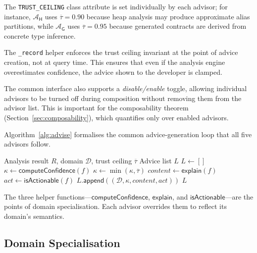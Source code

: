 \documentclass[11pt]{article}
\newcommand{\Adv}{\mathcal{A}}
\newcommand{\AdvH}{\Adv_{\mathsf{H}}}
\newcommand{\AdvG}{\Adv_{\mathsf{G}}}
\newcommand{\Domain}{\mathcal{D}}
\newcommand{\Trust}{\tau}
\newcommand{\TrustCeil}{\overline{\Trust}}
\newcommand{\Conf}{\kappa}
\begin{document}
The \texttt{TRUST\_CEILING} class attribute is set individually by each
advisor; for instance, $\AdvH$ uses $\TrustCeil = 0.90$ because heap
analysis may produce approximate alias partitions, while $\AdvG$ uses
$\TrustCeil = 0.95$ because generated contracts are derived from
concrete type inference.

\begin{remark}
The \texttt{\_record} helper enforces the trust ceiling invariant
at the point of advice creation, not at query time.  This ensures
that even if the analysis engine overestimates confidence, the
advice shown to the developer is clamped.
\end{remark}

The common interface also supports a \emph{disable/enable} toggle,
allowing individual advisors to be turned off during composition
without removing them from the advisor list.  This is important for
the composability theorem (Section~\ref{sec:composability}), which
quantifies only over enabled advisors.

Algorithm~\ref{alg:advise} formalises the common advice-generation
loop that all five advisors follow.

\begin{algorithm}[ht]
\caption{Common Advisor Loop}\label{alg:advise}
\begin{algorithmic}[1]
\REQUIRE Analysis result $R$, domain $\Domain$, trust ceiling $\TrustCeil$
\ENSURE Advice list $L$
\STATE $L \leftarrow []$
  \STATE $\Conf \leftarrow \mathsf{computeConfidence}(f)$
  \STATE $\Conf \leftarrow \min(\Conf, \TrustCeil)$
  \STATE $\mathit{content} \leftarrow \mathsf{explain}(f)$
  \STATE $\mathit{act} \leftarrow \mathsf{isActionable}(f)$
  \STATE $L.\mathsf{append}((\Domain, \Conf, \mathit{content}, \mathit{act}))$
\ENDFOR
\RETURN $L$
\end{algorithmic}
\end{algorithm}

The three helper functions—$\mathsf{computeConfidence}$,
$\mathsf{explain}$, and $\mathsf{isActionable}$—are the points
of domain specialisation.  Each advisor overrides them to reflect
its domain's semantics.

\subsection{Domain Specialisation}\label{sec:specialisation}
\end{document}
